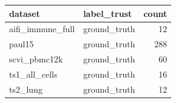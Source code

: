\begin{tabular}{llr}
\toprule
dataset & label\_trust & count \\
\midrule
aifi\_immune\_full & ground\_truth & 12 \\
paul15 & ground\_truth & 288 \\
scvi\_pbmc12k & ground\_truth & 60 \\
ts1\_all\_cells & ground\_truth & 16 \\
ts2\_lung & ground\_truth & 12 \\
\bottomrule
\end{tabular}

